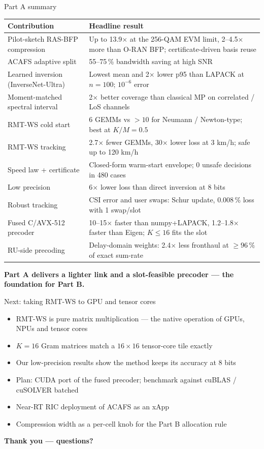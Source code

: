 \documentclass[aspectratio=169,11pt,xcolor=table]{beamer}
\newcommand{\takeaway}[1]{%
  \vfill
  \begin{alertblock}{}\centering\textbf{#1}\end{alertblock}}
\begin{document}
\begin{frame}{Part A summary}
  \centering
  \scriptsize\renewcommand{\arraystretch}{1.05}
  \begin{tabular}{>{\raggedright}p{}p{}}
    \toprule
    Contribution & Headline result \\
    \midrule
    Pilot-sketch RAS-BFP compression & Up to 13.9$\times$ at the 256-QAM EVM limit, 2--4.5$\times$ more than O-RAN BFP; certificate-driven basis reuse \\
    ACAFS adaptive split & 55--75\,\% bandwidth saving at high SNR \\
    Learned inversion (InverseNet-Ultra) & Lowest mean and 2$\times$ lower p95 than LAPACK at $n=100$; $10^{-6}$ error \\
    Moment-matched spectral interval & 2$\times$ better coverage than classical MP on correlated / LoS channels \\
    RMT-WS cold start & 6 GEMMs vs $>10$ for Neumann / Newton-type; best at $K/M = 0.5$ \\
    RMT-WS tracking & 2.7$\times$ fewer GEMMs, 30$\times$ lower loss at 3 km/h; safe up to 120 km/h \\
    Speed law + certificate & Closed-form warm-start envelope; 0 unsafe decisions in 480 cases \\
    Low precision & 6$\times$ lower loss than direct inversion at 8 bits \\
    Robust tracking & CSI error and user swaps: Schur update, 0.008\,\% loss with 1 swap/slot \\
    Fused C/AVX-512 precoder & 10--15$\times$ faster than numpy+LAPACK, 1.2--1.8$\times$ faster than Eigen; $K \le 16$ fits the slot \\
    RU-side precoding & Delay-domain weights: 2.4$\times$ less fronthaul at $\ge 96\,\%$ of exact sum-rate \\
    \bottomrule
  \end{tabular}
  \takeaway{Part A delivers a lighter link and a slot-feasible precoder --- the foundation for Part B.}
\end{frame}

\begin{frame}{Next: taking RMT-WS to GPU and tensor cores}
  \begin{itemize}
    \item RMT-WS is pure matrix multiplication --- the native operation of GPUs, NPUs and tensor cores
    \item $K = 16$ Gram matrices match a $16\times16$ tensor-core tile exactly
    \item Our low-precision results show the method keeps its accuracy at 8 bits
    \item Plan: CUDA port of the fused precoder; benchmark against cuBLAS / cuSOLVER batched
    \item Near-RT RIC deployment of ACAFS as an xApp
    \item Compression width as a per-cell knob for the Part B allocation rule
  \end{itemize}
  \vfill
  \centering
  {\Large\textbf{Thank you --- questions?}}
  \vfill
\end{frame}
\end{document}
